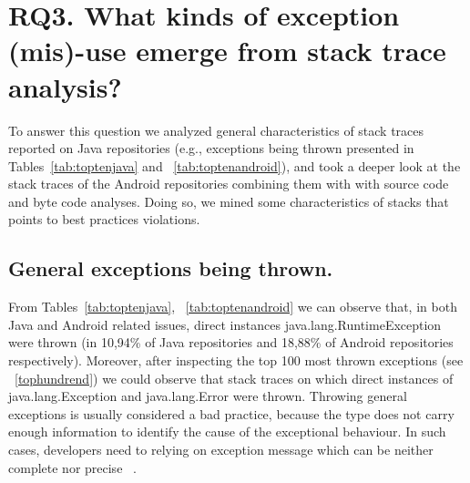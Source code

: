\documentclass[conference]{IEEEtran}
\begin{document}

\section{RQ3.  What kinds of exception (mis)-use emerge from stack trace analysis? }

To answer this question we analyzed general characteristics of stack traces reported on Java repositories (e.g., exceptions being thrown presented in Tables~\ref{tab:toptenjava} and ~\ref{tab:toptenandroid}), and took a deeper look at the stack traces of the Android repositories combining them with with source code and byte code analyses. Doing so, we mined some characteristics of stacks that points to best practices violations. 

\subsection{General exceptions being thrown.} 

From Tables~\ref{tab:toptenjava}, ~\ref{tab:toptenandroid} we can observe that, in both Java and Android related issues, direct instances java.lang.RuntimeException were thrown  (in 10,94\% of Java repositories and 18,88\% of Android repositories respectively). Moreover, after inspecting the top 100 most thrown exceptions (see ~\ref{tophundrend}) we could observe that stack traces on which direct instances of java.lang.Exception and java.lang.Error were thrown. Throwing general exceptions is usually considered a bad practice, because the type does not carry enough information to identify the cause of the exceptional behaviour. In such cases, developers need to relying on exception message which can be neither complete nor precise ~\cite{gosling2000java}. 
\end{document}
